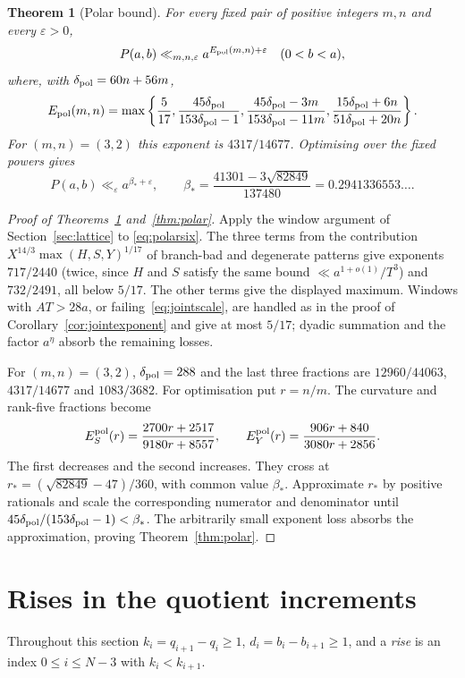 \documentclass[11pt]{article}
\newtheorem{theorem}{Theorem}[section]
\theoremstyle{definition}
\theoremstyle{remark}
\begin{document}
\begin{theorem}[Polar bound]\label{thm:polarconditional}
For every fixed pair of positive integers $m,n$ and every $\varepsilon>0$,
\[
 P(a,b)\ll_{m,n,\varepsilon} a^{E_{\rm pol}(m,n)+\varepsilon}
 \quad(0<b<a),
\]
where, with $\delta_{\rm pol}=60n+56m$,
\[
 E_{\rm pol}(m,n)=\max\left\{\frac5{17},\frac{45\delta_{\rm pol}}{153\delta_{\rm pol}-1},
 \frac{45\delta_{\rm pol}-3m}{153\delta_{\rm pol}-11m},\frac{15\delta_{\rm pol}+6n}{51\delta_{\rm pol}+20n}\right\}.
\]
For $(m,n)=(3,2)$ this exponent is $4317/14677$.
Optimising over the fixed powers gives
\[
 P(a,b)\ll_\varepsilon a^{\beta_*+\varepsilon},\qquad
 \beta_*=\frac{41301-3\sqrt{82849}}{137480}
        =0.2941336553\ldots.
\]
\end{theorem}
\begin{proof}[Proof of Theorems~\ref{thm:polarconditional} and~\ref{thm:polar}]
Apply the window argument of Section~\ref{sec:lattice} to
\eqref{eq:polarsix}. The three terms from the contribution
$X^{14/3}\max(H,S,Y)^{1/17}$ of branch-bad and degenerate patterns give exponents
$717/2440$ (twice, since $H$ and $S$ satisfy the same bound $\ll a^{1+o(1)}/T^3$) and $732/2491$, all below $5/17$.
The other terms give the displayed maximum. Windows with $AT>28a$, or
failing~\eqref{eq:jointscale}, are handled as in the proof of
Corollary~\ref{cor:jointexponent} and give at most $5/17$; dyadic summation and
the factor $a^\eta$ absorb the remaining losses.

For $(m,n)=(3,2)$, $\delta_{\rm pol}=288$ and the last three fractions are
$12960/44063$, $4317/14677$ and $1083/3682$.
For optimisation put $r=n/m$. The curvature and rank-five fractions become
\[
 E_S^{\rm pol}(r)=\frac{2700r+2517}{9180r+8557},\qquad
 E_Y^{\rm pol}(r)=\frac{906r+840}{3080r+2856}.
\]
The first decreases and the second increases. They cross at
$r_*=(\sqrt{82849}-47)/360$, with common value $\beta_*$.
Approximate $r_*$ by positive rationals and scale the corresponding
numerator and denominator until $45\delta_{\rm pol}/(153\delta_{\rm pol}-1)<\beta_*$.
The arbitrarily small exponent loss absorbs the approximation, proving
Theorem~\ref{thm:polar}.
\end{proof}

\section{Rises in the quotient increments}\label{sec:rises}

Throughout this section $k_i=q_{i+1}-q_i\ge1$, $d_i=b_i-b_{i+1}\ge1$, and a
\emph{rise} is an index $0\le i\le N-3$ with $k_i<k_{i+1}$.
\end{document}
